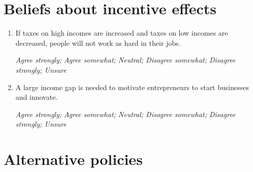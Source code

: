 \documentclass[11pt, headsepline]{article}
\begin{document}


\section*{Beliefs about incentive effects}

\begin{enumerate}[resume]
    \item If taxes on high incomes are increased and taxes on low incomes are decreased, people will not work as hard in their jobs.

    \textit{Agree strongly; Agree somewhat; Neutral; Disagree somewhat; Disagree strongly; Unsure}



    \item A large income gap is needed to motivate entrepreneurs to start businesses and innovate.

    \textit{Agree strongly; Agree somewhat; Neutral; Disagree somewhat; Disagree strongly; Unsure}

\end{enumerate}

\section*{Alternative policies}
\end{document}
